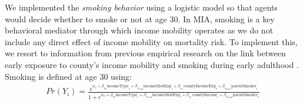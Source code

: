 \documentclass[class=article, crop=false, 12pt]{standalone}
\begin{document}
We implemented the \textit{smoking behavior} using a logistic model so that agents would decide whether to smoke or not at age 30. In MIA, smoking is a key behavioral mediator through which income mobility operates as we do not include any direct effect of income mobility on mortality risk. To implement this, we resort to information from previous empirical research  on the link between early exposure to county's income mobility and smoking during early adulthood \citep{daza2021}. Smoking is defined at age 30 using:
%
\begin{equation}  \label{ch04:eq_smoking}
\begin{split}
    Pr(Y_i) = \frac{
    e^{\alpha_s +
    \beta_{s_{k}} \text{incomeType}_i +
    \beta_{s_{imob}} \text{incomeMobExp}_i + 
    \beta_{s_{ie}} \text{countyIncomeExp}_i + 
    \beta_{s_{psmk}} \text{parentSmoker}_i}}{
    1 + e^{\alpha_s +
    \beta_{s_{k}} \text{incomeType}_i +
    \beta_{s_{imob}} \text{incomeMobExp}_i + 
    \beta_{s_{ie}} \text{countyIncome}_i + 
    \beta_{s_{psmk}} \text{parentSmoker}_i}}
\end{split}
 \end{equation}
\end{document}
